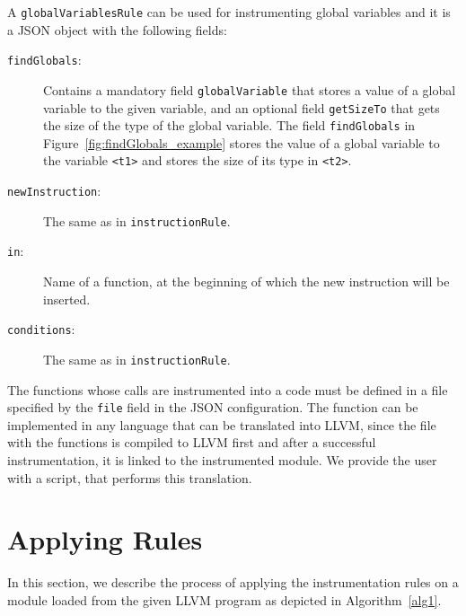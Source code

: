 \noindent A \texttt{globalVariablesRule} can be used for instrumenting global
variables and it is a JSON object with the following fields:
\begin{description}
    \item[\texttt{findGlobals}:] Contains a mandatory field
    \texttt{globalVariable} that stores a value of a global variable to the
    given variable, and an optional field \texttt{getSizeTo} that gets the size
    of the type of the global variable. The field \texttt{findGlobals} in
    Figure~\ref{fig:findGlobals_example} stores the value of a global variable
    to the variable \texttt{<t1>} and stores the size of its type in
    \texttt{<t2>}.

    \begin{minipage}{\linewidth}
        
        \label{fig:findGlobals_example}
      \end{minipage}

    \item[\texttt{newInstruction}:] The same as in \texttt{instructionRule}.
    \item[\texttt{in}:] Name of a function, at the beginning of which the new
    instruction will be inserted.
    \item[\texttt{conditions}:] The same as in \texttt{instructionRule}.
\end{description}

The functions whose calls are instrumented into a code must be defined in a
file specified by the \texttt{file} field in the JSON configuration. The
function can be implemented in any language that can be translated into LLVM,
since the file with the functions is compiled to LLVM first and after a
successful instrumentation, it is linked to the instrumented module. We provide
the user with a script, that performs this translation.

\section{Applying Rules}

In this section, we describe the process of applying the instrumentation rules
on a module loaded from the given LLVM program as depicted in
Algorithm~\ref{alg1}.

